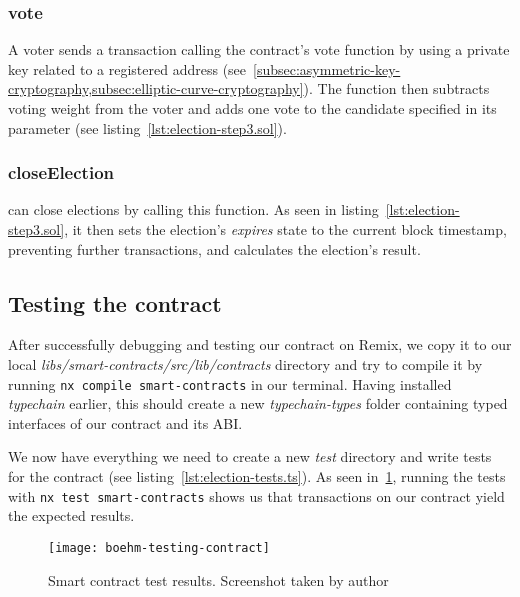 \subsubsection{vote}

A voter sends a transaction calling the contract's vote function by using a private key related to a registered address (see~\cref{subsec:asymmetric-key-cryptography,subsec:elliptic-curve-cryptography}).
The function then subtracts voting weight from the voter and adds one vote to the candidate specified in its parameter (see listing~\ref{lst:election-step3.sol}).

\subsubsection{closeElection}

 can close elections by calling this function.
As seen in listing~\ref{lst:election-step3.sol}, it then sets the election's \emph{expires} state to the current block timestamp, preventing further transactions, and calculates the election's result.

\subsection{Testing the contract}\label{subsec:testing-the-contract}

After successfully debugging and testing our contract on Remix, we copy it to our local \emph{libs/smart-contracts/src/lib/contracts} directory and try to compile it by running \texttt{nx compile smart-contracts} in our terminal.
Having installed \emph{typechain} earlier, this should create a new \emph{typechain-types} folder containing typed interfaces of our contract and its \gls{ABI}.

We now have everything we need to create a new \emph{test} directory and write tests for the contract (see listing~\ref{lst:election-tests.ts}).
As seen in~\cref{fig:smart-contract-test-results}, running the tests with \texttt{nx test smart-contracts} shows us that transactions on our contract yield the expected results.

\begin{figure}[H]
    \centering
    \texttt{[image: boehm-testing-contract]}
    \caption[Smart contract test results]{Smart contract test results. Screenshot taken by author}
    \label{fig:smart-contract-test-results}
\end{figure}

